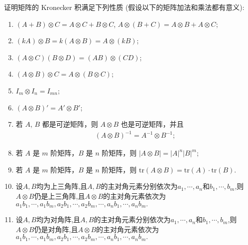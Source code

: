 \documentclass[../../main.tex]{subfiles}
\begin{document}
\begin{theorem}[矩阵的Kronecker积的基本性质]\label{theorem:矩阵的Kronecker积的基本性质}
证明矩阵的 Kronecker 积满足下列性质 (假设以下的矩阵加法和乘法都有意义):
\begin{enumerate}[(1)]
\item\label{矩阵的Kronecker积的基本性质(1)} $(A + B)\otimes C = A\otimes C + B\otimes C$, $A\otimes (B + C) = A\otimes B + A\otimes C$;
\item\label{矩阵的Kronecker积的基本性质(2)} $(kA)\otimes B = k(A\otimes B) = A\otimes (kB)$;
\item\label{矩阵的Kronecker积的基本性质(3)} $(A\otimes C)(B\otimes D)=(AB)\otimes (CD)$;
\item\label{矩阵的Kronecker积的基本性质(4)} $(A\otimes B)\otimes C = A\otimes (B\otimes C)$;
\item\label{矩阵的Kronecker积的基本性质(5)} $I_m\otimes I_n = I_{mn}$;
\item\label{矩阵的Kronecker积的基本性质(6)} $(A\otimes B)' = A'\otimes B'$;
\item\label{矩阵的Kronecker积的基本性质(7)} 若 $A$, $B$ 都是可逆矩阵，则 $A\otimes B$ 也是可逆矩阵，并且
\begin{align*}
    (A\otimes B)^{-1}=A^{-1}\otimes B^{-1};
\end{align*}
\item\label{矩阵的Kronecker积的基本性质(8)} 若 $A$ 是 $m$ 阶矩阵，$B$ 是 $n$ 阶矩阵，则 $|A\otimes B| = |A|^n|B|^m$;
\item\label{矩阵的Kronecker积的基本性质(9)} 若 $A$ 是 $m$ 阶矩阵，$B$ 是 $n$ 阶矩阵，则 $\mathrm{tr}(A\otimes B)=\mathrm{tr}(A)\cdot\mathrm{tr}(B)$.
\item\label{矩阵的Kronecker积的基本性质(10)} 设$A,B$均为上三角阵,且$A,B$的主对角元素分别依次为$a_1,\cdots,a_n$和$b_1,\cdots,b_m$,则$A\otimes B$仍是上三角阵,且$A\otimes B$的主对角元素依次为$a_1b_1,\cdots,a_1b_m,a_2b_1,\cdots,a_2b_m,\cdots,a_nb_1,\cdots,a_nb_m.$
\item\label{矩阵的Kronecker积的基本性质(11)} 设$A,B$均为对角阵,且$A,B$的主对角元素分别依次为$a_1,\cdots,a_n$和$b_1,\cdots,b_m$,则$A\otimes B$仍是对角阵,且$A\otimes B$的主对角元素依次为$a_1b_1,\cdots,a_1b_m,a_2b_1,\cdots,a_2b_m,\cdots,a_nb_1,\cdots,a_nb_m.$
\end{enumerate}
\end{theorem}
\end{document}
